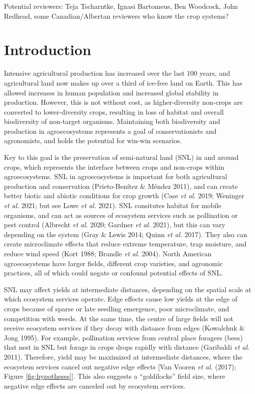 \documentclass[]{elsarticle} %
\begin{document}
Potential reviewers: Teja Tscharntke, Ignasi Bartomeus, Ben Woodcock, John Redhead, some Canadian/Albertan reviewers who know the crop systems?

\newpage
\doublespacing

\hypertarget{introduction}{%
\section{Introduction}\label{introduction}}

Intensive agricultural production has increased over the last 100 years, and agricultural land now makes up over a third of ice-free land on Earth.
This has allowed increases in human population and increased global stability in production.
However, this is not without cost, as higher-diversity non-crops are converted to lower-diversity crops, resulting in loss of habitat and overall biodiversity of non-target organisms.
Maintaining both biodiversity and production in agroecosystems represents a goal of conservationists and agronomists, and holds the potential for win-win scenarios.

Key to this goal is the preservation of semi-natural land (SNL) in and around crops, which represents the interface between crops and non-crops within agroecosystems.
SNL in agroecosystems is important for both agricultural production and conservation (Prieto-Benítez \& Méndez 2011), and can create better biotic and abiotic conditions for crop growth (Case \emph{et al.} 2019; Weninger \emph{et al.} 2021; but see Lowe \emph{et al.} 2021).
SNL consitutes habitat for mobile organisms, and can act as sources of ecosystem services such as pollination or pest control (Albrecht \emph{et al.} 2020; Gardner \emph{et al.} 2021), but this can vary depending on the system (Gray \& Lewis 2014; Quinn \emph{et al.} 2017).
They also can create microclimate effects that reduce extreme temperature, trap moisture, and reduce wind speed (Kort 1988; Brandle \emph{et al.} 2004).
North American agroecosystems have larger fields, different crop varieties, and agronomic practices, all of which could negate or confound potential effects of SNL.

SNL may affect yields at intermediate distances, depending on the spatial scale at which ecosystem services operate.
Edge effects cause low yields at the edge of crops because of sparse or late seedling emergence, poor microclimate, and competition with weeds.
At the same time, the centre of large fields will not receive ecosystem services if they decay with distance from edges (Kowalchuk \& Jong 1995).
For example, pollination services from central place foragers (bees) that nest in SNL but forage in crops drops rapidly with distance (Garibaldi \emph{et al.} 2011).
Therefore, yield may be maximized at intermediate distances, where the ecosystem services cancel out negative edge effects {[}Van Vooren \emph{et al.} (2017); Figure \ref{fig:hypotheses}{]}.
This also suggests a ``goldilocks'' field size, where negative edge effects are canceled out by ecosystem services.
\end{document}
